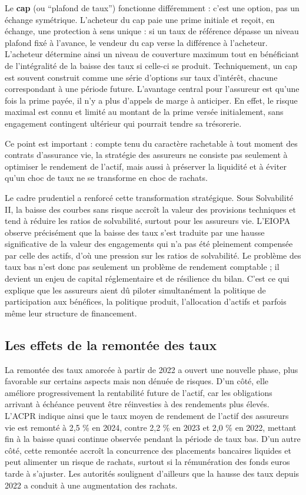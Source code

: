 Le \textbf{cap} (ou “plafond de taux”) fonctionne différemment : c'est une option, pas un échange symétrique. L'acheteur du cap paie une prime initiale et reçoit, en échange, une protection à sens unique : si un taux de référence dépasse un niveau plafond fixé à l'avance, le vendeur du cap verse la différence à l'acheteur. L'acheteur détermine ainsi un niveau de couverture maximum tout en bénéficiant de l'intégralité de la baisse des taux si celle-ci se produit. Techniquement, un cap est souvent construit comme une série d'options sur taux d'intérêt, chacune correspondant à une période future. L'avantage central pour l'assureur est qu'une fois la prime payée, il n'y a plus d'appels de marge à anticiper. En effet, le risque maximal est connu et limité au montant de la prime versée initialement, sans engagement contingent ultérieur qui pourrait tendre sa trésorerie.

Ce point est important : compte tenu du caractère rachetable à tout moment des contrats d'assurance vie, la stratégie des assureurs ne consiste pas seulement à optimiser le rendement de l'actif, mais aussi à préserver la liquidité et à éviter qu'un choc de taux ne
se transforme en choc de rachats.

Le cadre prudentiel a renforcé cette transformation stratégique. Sous Solvabilité II, la baisse des courbes sans risque accroît la valeur des provisions techniques et tend à réduire les ratios de solvabilité, surtout pour les assureurs vie. L'EIOPA observe précisément que la baisse des taux s'est traduite par une hausse significative de la valeur des engagements qui n'a pas été pleinement compensée par celle des actifs, d'où une pression sur les ratios de solvabilité. Le problème des taux bas n'est donc pas seulement un problème de rendement comptable ; il devient un enjeu de capital réglementaire et de résilience du bilan. C'est ce qui explique que les assureurs aient dû piloter simultanément la politique de participation aux bénéfices, la politique produit, l'allocation d'actifs et parfois même leur structure de financement.

\subsection{Les effets de la remontée des taux}

La remontée des taux amorcée à partir de 2022 a ouvert une nouvelle phase, plus favorable sur certains aspects mais non dénuée de risques. D'un côté, elle améliore progressivement la rentabilité future de l'actif, car les obligations arrivant à échéance peuvent être réinvesties à des rendements plus élevés. L'ACPR \cite{revalo_acpr_2024} indique ainsi que le taux moyen de rendement de l'actif des assureurs vie est remonté à 2,5 \% en 2024, contre 2,2 \% en 2023 et 2,0 \% en 2022, mettant fin à la baisse quasi continue observée pendant la période de taux bas. D'un autre côté, cette remontée accroît la concurrence des placements bancaires liquides et peut alimenter un risque de rachats, surtout si la rémunération des fonds euros tarde à s'ajuster. Les autorités soulignent d'ailleurs que la hausse des taux depuis 2022 a conduit à une augmentation des rachats.

